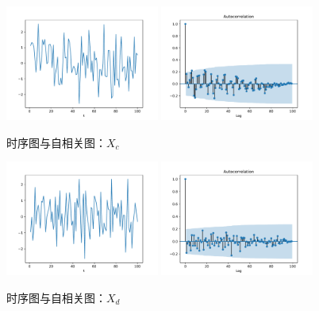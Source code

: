 \documentclass[cn]{homework}
\begin{document}
\begin{subproblem}
        \item
        \begin{figure}[h]
            \centering
            \includegraphics[width=0.45\textwidth]{Xc.pdf}
            \includegraphics[width=0.45\textwidth]{Xc-acf.pdf}
            \caption{时序图与自相关图：$X_c$}
        \end{figure}

        \item
        \begin{figure}[h]
            \centering
            \includegraphics[width=0.45\textwidth]{Xd.pdf}
            \includegraphics[width=0.45\textwidth]{Xd-acf.pdf}
            \caption{时序图与自相关图：$X_d$}
        \end{figure}


\end{subproblem}
\end{document}
